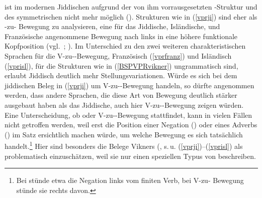 \hai{{\VPR}} ist im modernen Jiddischen aufgrund der von ihm vorrausgesetzten \hai{{\VO}}-Struktur und des symmetrischen  nicht mehr möglich (\citealt[68f]{Vikner2001}). Strukturen wie in (\ref{vprji}) sind eher als -zu- Bewegung zu analysieren, eine für das Jiddische,  Isländische, und Französische angenommene Bewegung nach links in eine höhere funktionale Kopfposition (vgl.\, \citealt[4–7]{Vikner2001}; \citealt{Diesing1990}). Im Unterschied zu den zwei weiteren charakteristischen Sprachen für die {V}-zu--Bewegung, Französisch (\ref{vprfranz}) und Isländisch (\ref{vprisl}), für die Strukturen wie in (\ref{BSPVPRvikner}) ungrammatisch sind, erlaubt Jiddisch deutlich mehr Stellungsvariationen. Würde es sich bei dem jiddischen Beleg in (\ref{vprji}) um {V}-zu--Bewegung handeln, so dürfte angenommen werden, dass andere Sprachen, die diese Art von Bewegung deutlich stärker ausgebaut haben als das Jiddische, auch hier {V}-zu--Bewegung zeigen würden. Eine Unterscheidung, ob \hai{{\VPR}} oder {V}-zu--Bewegung stattfindet, kann in vielen Fällen nicht getroffen werden, weil erst die Position einer Negation () oder eines Adverbs (\hai{{\AdvP}}) im Satz ersichtlich machen würde, um welche Bewegung es sich tatsächlich handelt.\footnote{Bei \hai{{\VPR}} stünde etwa die Negation links vom finiten Verb, bei {V}-zu- Bewegung stünde sie rechts davon.} Hier sind besonders die Belege Vikners (\citeyear[66–68, Bsp. 139–154]{Vikner2001}, s.\,u.  (\ref{vprji})–(\ref{vprisl}) als problematisch einzuschätzen, weil sie nur einen speziellen Typus von \hai{{\VPR}} beschreiben. 

